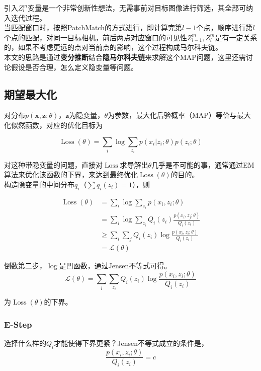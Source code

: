 引入$Z^m_l$变量是一个非常创新性想法，无需事前对目标图像进行筛选，其全部可纳入迭代过程。\\

当匹配窗口时，按照PatchMatch的方式进行，即计算完第$l-1$个点，顺序进行第$l$个点的匹配，对同一目标相机，前后两点对应窗口的可见性$Z_{l-1}^m,Z^m_l$是有一定关系的，如果不考虑更远的点对当前点的影响，这个过程构成马尔科夫链。\\

本文的思路是通过\textbf{变分推断}结合\textbf{隐马尔科夫链}来求解这个MAP问题，这里还需讨论假设是否合理，怎么定义隐变量等问题。

\subsection{期望最大化}

	对分布$p(\mathbf{x},\mathbf{z};\theta)$，$\mathbf{z}$为隐变量，$\theta$为参数，最大化后验概率（MAP）等价与最大化似然函数，对应的优化目标为

	$$
		\mathop{Loss}(\theta) = \sum_{i}\log\sum_{z_i} p(x_i|z_i;\theta)p(z_i;\theta)
	$$

	对这种带隐变量的问题，直接对$\mathop{Loss}$求导解出$\theta$几乎是不可能的事，通常通过EM算法来优化该函数的下界，来达到最终优化$\mathop{Loss}(\theta)$的目的。\\

	构造隐变量的中间分布$q_i$（$\sum q_i(z_i) = 1$），则

	\begin{align}
		\mathop{Loss}(\theta) 
		&= \sum_i\log\sum_{z_i}p(x_i,z_i;\theta)\\
		&= \sum_i\log\sum_{z_i} Q_i(z_i) \frac{p(x_i,z_j;\theta)}{Q_i(z_i)}\\
		&\geq \sum_i\sum_j Q_i(z_i) \log\frac{p(x_i,z_i;\theta)}{Q_i(z_i)}\\
		&= \mathcal{L}(\theta)
	\end{align}

	倒数第二步，$\log$是凹函数，通过Jensen不等式可得。\\

	\begin{equation}
		\mathcal{L}(\theta) = \sum_i\sum_{z_i} Q_i(z_i) \log\frac{p(x_i,z_i;\theta)}{Q_i(z_i)}
	\end{equation}\label{ELBO}

	为$\mathop{Loss}(\theta)$的下界。

	\subsubsection*{E-Step}
		选择什么样的$Q_i$才能使得下界更紧？Jensen不等式成立的条件是，
		$$
			\frac{p(x_i,z_i;\theta)}{Q_i(z_i)} = c
		$$

